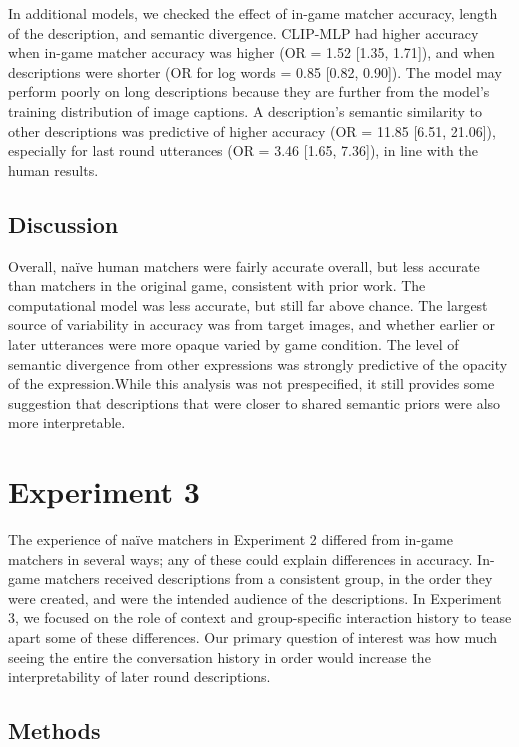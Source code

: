 \documentclass[10pt, letterpaper]{article}
\begin{document}
In additional models, we checked the effect of in-game matcher accuracy,
length of the description, and semantic divergence. CLIP-MLP had higher
accuracy when in-game matcher accuracy was higher (OR = 1.52 {[}1.35,
1.71{]}), and when descriptions were shorter (OR for log words = 0.85
{[}0.82, 0.90{]}). The model may perform poorly on long descriptions
because they are further from the model's training distribution of image
captions. A description's semantic similarity to other descriptions was
predictive of higher accuracy (OR = 11.85 {[}6.51, 21.06{]}), especially
for last round utterances (OR = 3.46 {[}1.65, 7.36{]}), in line with the
human results.

\subsection{Discussion}\label{discussion}

Overall, naïve human matchers were fairly accurate overall, but less
accurate than matchers in the original game, consistent with prior work.
The computational model was less accurate, but still far above chance.
The largest source of variability in accuracy was from target images,
and whether earlier or later utterances were more opaque varied by game
condition. The level of semantic divergence from other expressions was
strongly predictive of the opacity of the expression.While this analysis
was not prespecified, it still provides some suggestion that
descriptions that were closer to shared semantic priors were also more
interpretable.

\section{Experiment 3}\label{experiment-3}

The experience of naïve matchers in Experiment 2 differed from in-game
matchers in several ways; any of these could explain differences in
accuracy. In-game matchers received descriptions from a consistent
group, in the order they were created, and were the intended audience of
the descriptions. In Experiment 3, we focused on the role of context and
group-specific interaction history to tease apart some of these
differences. Our primary question of interest was how much seeing the
entire the conversation history in order would increase the
interpretability of later round descriptions.

\subsection{Methods}\label{methods-2}
\end{document}
